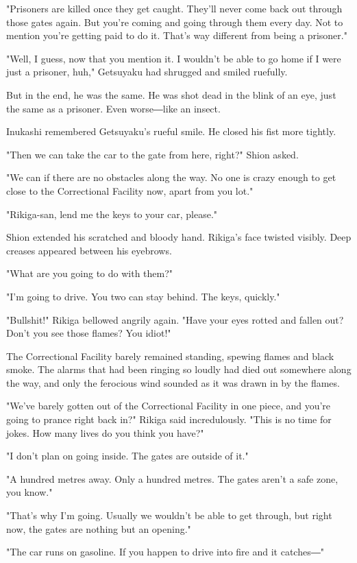 "Prisoners are killed once they get caught. They'll never come back out
through those gates again. But you're coming and going through them
every day. Not to mention you're getting paid to do it. That's way
different from being a prisoner."

"Well, I guess, now that you mention it. I wouldn't be able to go home
if I were just a prisoner, huh," Getsuyaku had shrugged and smiled
ruefully.

But in the end, he was the same. He was shot dead in the blink of an
eye, just the same as a prisoner. Even worse―like an insect.

Inukashi remembered Getsuyaku's rueful smile. He closed his fist more
tightly.

"Then we can take the car to the gate from here, right?" Shion asked.

"We can if there are no obstacles along the way. No one is crazy enough
to get close to the Correctional Facility now, apart from you lot."

"Rikiga-san, lend me the keys to your car, please."

Shion extended his scratched and bloody hand. Rikiga's face twisted
visibly. Deep creases appeared between his eyebrows.

"What are you going to do with them?"

"I'm going to drive. You two can stay behind. The keys, quickly."

"Bullshit!" Rikiga bellowed angrily again. "Have your eyes rotted and
fallen out? Don't you see those flames? You idiot!"

The Correctional Facility barely remained standing, spewing flames and
black smoke. The alarms that had been ringing so loudly had died out
somewhere along the way, and only the ferocious wind sounded as it was
drawn in by the flames.

"We've barely gotten out of the Correctional Facility in one piece, and
you're going to prance right back in?" Rikiga said incredulously. "This
is no time for jokes. How many lives do you think you have?"

"I don't plan on going inside. The gates are outside of it."

"A hundred metres away. Only a hundred metres. The gates aren't a safe
zone, you know."

"That's why I'm going. Usually we wouldn't be able to get through, but
right now, the gates are nothing but an opening."

"The car runs on gasoline. If you happen to drive into fire and it
catches―"

